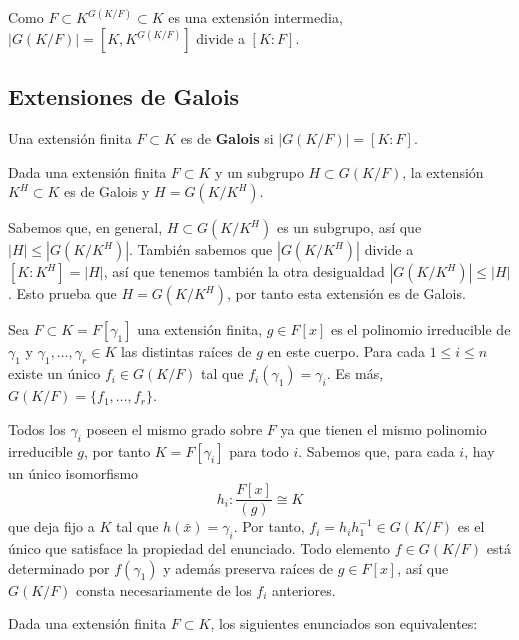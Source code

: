 
Como \(F\subset K^{G(K/F)} \subset K\) es una extensión intermedia,
\(|G(K/F)|=[K,K^{G(K/F)}]\) divide a \([K:F]\). 

\hypertarget{extensiones-de-galois}{%
\subsection{Extensiones de Galois}\label{extensiones-de-galois}}


Una extensión finita \(F\subset K\) es de \textbf{Galois} si
\(|G(K/F)|=[K:F]\). 


Dada una extensión finita \(F\subset K\) y un subgrupo
\(H\subset G(K/F)\), la extensión \(K^H\subset K\) es de Galois y
\(H=G(K/K^H)\). 


Sabemos que, en general, \(H\subset G(K/K^H)\) es un subgrupo, así que
\(|H|\leq |G(K/K^H)|\). También sabemos que \(|G(K/K^H)|\) divide a
\([K:K^H]=|H|\), así que tenemos también la otra desigualdad
\(|G(K/K^H)|\leq|H|\). Esto prueba que \(H=G(K/K^H)\), por tanto esta
extensión es de Galois. 


Sea \(F\subset K=F[\gamma_1]\) una extensión finita, \(g\in F[x]\) es
el polinomio irreducible de \(\gamma_1\) y
\(\gamma_1,\dots,\gamma_r\in K\) las distintas raíces de \(g\) en este
cuerpo. Para cada \(1\leq i\leq n\) existe un único \(f_i\in G(K/F)\)
tal que \(f_i(\gamma_1)=\gamma_i\). Es más,
\(G(K/F)=\{f_1,\dots,f_r\}\). 


Todos los \(\gamma_i\) poseen el mismo grado sobre \(F\) ya que tienen
el mismo polinomio irreducible \(g\), por tanto \(K=F[\gamma_i]\) para
todo \(i\). Sabemos que, para cada \(i\), hay un único isomorfismo
\[h_i\colon \frac{F[x]}{(g)}\cong K\] que deja fijo a \(K\) tal que
\(h(\bar{x})=\gamma_i\). Por tanto, \(f_i=h_ih_1^{-1}\in G(K/F)\) es
el único que satisface la propiedad del enunciado. Todo elemento
\(f\in G(K/F)\) está determinado por \(f(\gamma_1)\) y además preserva
raíces de \(g\in F[x]\), así que \(G(K/F)\) consta necesariamente de los
\(f_i\) anteriores. 


Dada una extensión finita \(F\subset K\), los siguientes enunciados son
equivalentes:

